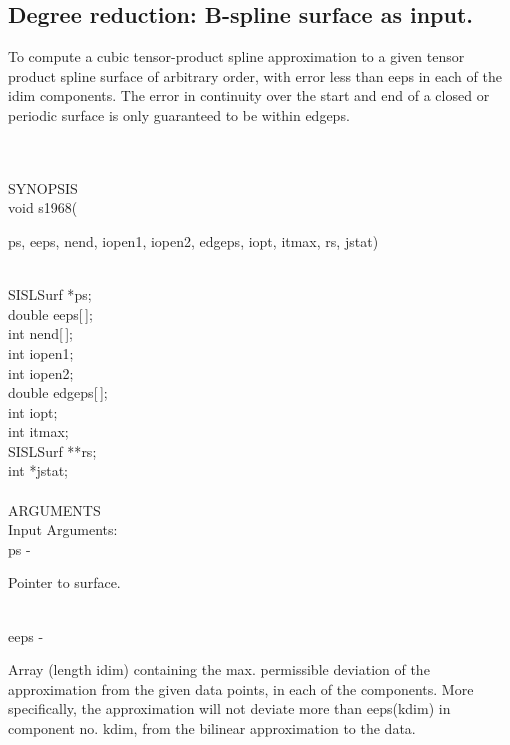 \subsection{Degree reduction: B-spline surface as input.}
\begin{minipg1}
To compute a cubic tensor-product spline approximation
           to a given tensor product spline surface of arbitrary order,
           with error less than eeps in each of the idim components.
           The error in continuity over the start and end of
           a closed or periodic surface is only guaranteed to be within
           edgeps.
\end{minipg1} \\ \\
SYNOPSIS\\
        \> void s1968(\begin{minipg3}
            {\fov ps}, {\fov eeps}, {\fov nend}, {\fov iopen1}, {\fov iopen2}, {\fov edgeps}, {\fov iopt}, {\fov itmax}, {\fov rs}, {\fov jstat})
                \end{minipg3}\\
                \>\>    SISLSurf    \>  *{\fov ps};\\
                \>\>    double \> {\fov eeps}[\,];\\
                \>\>    int    \>  {\fov nend}[\,];\\
                \>\>    int    \>  {\fov iopen1};\\
                \>\>    int    \>  {\fov iopen2};\\
                \>\>    double \> {\fov edgeps}[\,];\\
                \>\>    int    \>  {\fov iopt};\\
                \>\>    int    \>  {\fov itmax};\\
                \>\>    SISLSurf    \>  **{\fov rs};\\
                \>\>    int    \>  *{\fov jstat};\\
\\
ARGUMENTS\\
	\>Input Arguments:\\
        \>\>    {\fov ps}\> - \>  \begin{minipg2}
                     Pointer to surface.
                               \end{minipg2}\\
        \>\>    {\fov eeps}\> - \>  \begin{minipg2}
                     Array (length idim) containing the max. permissible
                  deviation of the approximation from the given data
                  points, in each of the components. More specifically,
                  the approximation will not deviate more than eeps(kdim)
                  in component no. kdim, from the bilinear approximation
                  to the data.
                               \end{minipg2}\\[0.8ex]
